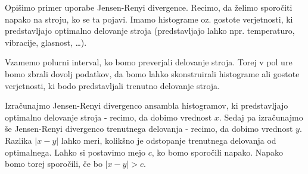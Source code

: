 Opišimo primer uporabe Jensen-Renyi divergence. Recimo, da želimo sporočiti napako na stroju, ko se ta pojavi. Imamo histograme oz. gostote verjetnosti, ki predstavljajo optimalno delovanje stroja (predstavljajo lahko npr. temperaturo, vibracije, glasnost, \ldots).

Vzamemo polurni interval, ko bomo preverjali delovanje stroja. Torej v pol ure bomo zbrali dovolj podatkov, da bomo lahko skonstruirali histograme ali gostote verjetnosti, ki bodo predstavljali trenutno delovanje stroja.

Izračunajmo Jensen-Renyi divergenco ansambla histogramov, ki predstavljajo optimalno delovanje stroja - recimo, da dobimo vrednost $x$. Sedaj pa izračunajmo še Jensen-Renyi divergenco trenutnega delovanja - recimo, da dobimo vrednost $y$. Razlika $|x-y|$ lahko meri, kolikšno je odstopanje trenutnega delovanja od optimalnega. Lahko si postavimo mejo $c$, ko bomo sporočili napako. Napako bomo torej sporočili, če bo $|x-y| > c$.